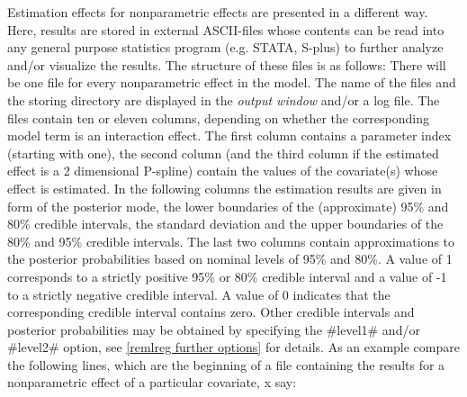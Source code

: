 Estimation effects for nonparametric effects are presented in a
different way. Here, results are stored in external ASCII-files
whose contents can be read into any general purpose statistics
program (e.g. STATA, S-plus) to further analyze and/or visualize
the results. The structure of these files is as follows: There
will be one file for every nonparametric effect in the model. The
name of the files and the storing directory are displayed in the
{\em output window} and/or a log file. The files contain ten or
eleven columns, depending on whether the corresponding model term
is an interaction effect. The first column contains a parameter
index (starting with one), the second column (and the third column
if the estimated effect is a 2 dimensional P-spline) contain the
values of the covariate(s) whose effect is estimated. In the
following columns the estimation results are given in form of the
posterior mode, the lower boundaries of the (approximate) 95\% and
80\% credible intervals, the standard deviation and the upper
boundaries of the 80\% and 95\% credible intervals. The last two
columns contain approximations to the posterior probabilities
based on nominal levels of 95\% and 80\%. A value of 1 corresponds
to a strictly positive 95\% or 80\% credible interval and a value
of -1 to a strictly negative credible interval. A value of 0
indicates that the corresponding credible interval contains zero.
Other credible intervals and posterior probabilities may be
obtained by specifying the #level1# and/or #level2# option, see
\autoref{remlreg further options} for details. As an example
compare the following lines, which are the beginning of a file
containing the results for a nonparametric effect of a particular
covariate, x say:

